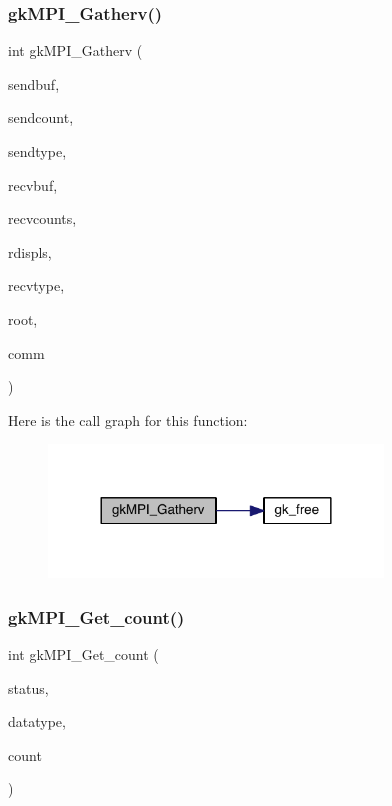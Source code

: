 \subsubsection{\texorpdfstring{gk\+M\+P\+I\+\_\+\+Gatherv()}{gkMPI\_Gatherv()}}
{\footnotesize\ttfamily int gk\+M\+P\+I\+\_\+\+Gatherv (\begin{DoxyParamCaption}\item[{void $\ast$}]{sendbuf,  }\item[{\hyperlink{a00876_aaa5262be3e700770163401acb0150f52}{idx\+\_\+t}}]{sendcount,  }\item[{M\+P\+I\+\_\+\+Datatype}]{sendtype,  }\item[{void $\ast$}]{recvbuf,  }\item[{\hyperlink{a00876_aaa5262be3e700770163401acb0150f52}{idx\+\_\+t} $\ast$}]{recvcounts,  }\item[{\hyperlink{a00876_aaa5262be3e700770163401acb0150f52}{idx\+\_\+t} $\ast$}]{rdispls,  }\item[{M\+P\+I\+\_\+\+Datatype}]{recvtype,  }\item[{\hyperlink{a00876_aaa5262be3e700770163401acb0150f52}{idx\+\_\+t}}]{root,  }\item[{M\+P\+I\+\_\+\+Comm}]{comm }\end{DoxyParamCaption})}

Here is the call graph for this function\+:\nopagebreak
\begin{figure}[H]
\begin{center}
\leavevmode
\includegraphics[width=252pt]{a00359_a807659087675fb1da493b8dd6d4396b0_cgraph}
\end{center}
\end{figure}
\mbox{\label{a00359_a3f4ae6f17f49b22ef461eb0a96853302}} 
\subsubsection{\texorpdfstring{gk\+M\+P\+I\+\_\+\+Get\+\_\+count()}{gkMPI\_Get\_count()}}
{\footnotesize\ttfamily int gk\+M\+P\+I\+\_\+\+Get\+\_\+count (\begin{DoxyParamCaption}\item[{M\+P\+I\+\_\+\+Status $\ast$}]{status,  }\item[{M\+P\+I\+\_\+\+Datatype}]{datatype,  }\item[{\hyperlink{a00876_aaa5262be3e700770163401acb0150f52}{idx\+\_\+t} $\ast$}]{count }\end{DoxyParamCaption})}

